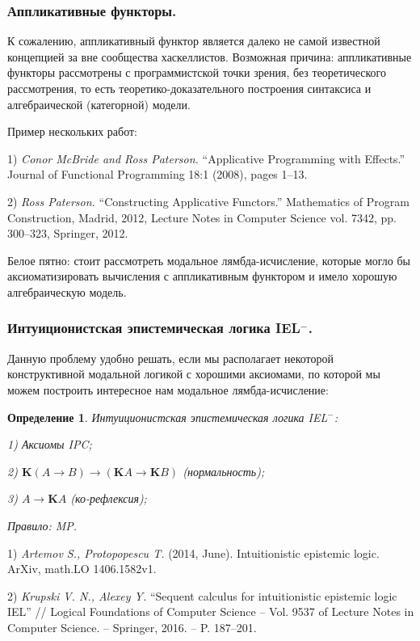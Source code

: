 \documentclass[10pt,pdf,utf8,russian,aspectratio=169]{beamer}
\newtheorem{defin}{Определение}
\begin{document}
\begin{frame}
\frametitle{Аппликативные функторы.}

К сожалению, аппликативный функтор является далеко не самой известной концепцией за вне сообщества хаскеллистов.
Возможная причина: аппликативные функторы рассмотрены с программистской точки зрения, без теоретического рассмотрения,
то есть теоретико-доказательного построения синтаксиса и алгебраической (категорной) модели.

\vspace{\baselineskip}

Пример нескольких работ:

\vspace{\baselineskip}

1) \emph{Conor McBride and Ross Paterson.} ``Applicative Programming with Effects.'' Journal of Functional
Programming 18:1 (2008), pages 1--13.

2) \emph{Ross Paterson.} ``Constructing Applicative Functors.''  Mathematics of Program Construction, Madrid,
2012, Lecture Notes in Computer Science vol. 7342, pp. 300--323, Springer, 2012.

\vspace{\baselineskip}

Белое пятно: стоит рассмотреть модальное лямбда-исчисление, которые могло бы
аксиоматизировать вычисления с аппликативным функтором и имело хорошую алгебраическую модель.

\end{frame}

\begin{frame}
\frametitle{Интуиционистская эпистемическая логика IEL$^{-}$.}


Данную проблему удобно решать, если мы располагает некоторой конструктивной модальной логикой с хорошими аксиомами,
по которой мы можем построить интересное нам модальное лямбда-исчисление:

\vspace{\baselineskip}

\begin{defin} Интуиционистская эпистемическая логика IEL$^{-}$:

  1) Аксиомы IPC;

  2) $\textbf{K}(A \to B) \to (\textbf{K}A \to \textbf{K}B)$ (нормальность);

  3) $A \to \textbf{K}A$ (ко-рефлексия);

  Правило: MP.

\end{defin}

\vspace{\baselineskip}

1) \emph{Artemov S., Protopopescu T.} (2014, June). Intuitionistic epistemic logic. ArXiv, math.LO 1406.1582v1.

2) \emph{Krupski V. N., Alexey Y.} ``Sequent calculus for intuitionistic epistemic logic IEL'' // Logical
Foundations of Computer Science -- Vol. 9537 of Lecture Notes in Computer Science. -- Springer, 2016. -- P. 187–201.

\end{frame}
\end{document}
